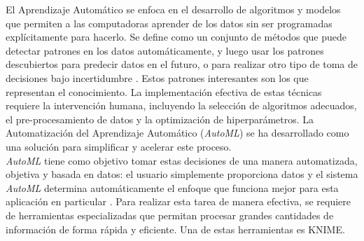 El Aprendizaje Automático se enfoca en el desarrollo de algoritmos y modelos que permiten a las computadoras aprender de los datos sin ser programadas explícitamente para hacerlo. Se define como un conjunto de métodos que puede detectar patrones en los datos automáticamente, y luego usar los patrones descubiertos para predecir datos en el futuro, o para realizar otro tipo de toma de decisiones bajo incertidumbre \citep{murphy2012machine}. Estos patrones interesantes son los que representan el conocimiento. La implementación efectiva de estas técnicas requiere la intervención humana, incluyendo la selección de algoritmos adecuados, el pre-procesamiento de datos y la optimización de hiperparámetros. La Automatización del Aprendizaje Automático (\textit{AutoML}) se ha desarrollado como una solución para simplificar y acelerar este proceso. \\
 \textit{AutoML} tiene como objetivo tomar estas decisiones de una manera automatizada, objetiva y basada en datos: el usuario simplemente proporciona datos y el sistema \textit{AutoML} determina automáticamente el enfoque que funciona mejor para esta aplicación en particular \citep{hutter2019automated}. Para realizar esta tarea de manera efectiva, se requiere de herramientas especializadas que permitan procesar grandes cantidades de información de forma rápida y eficiente. Una de estas herramientas es KNIME.\\
